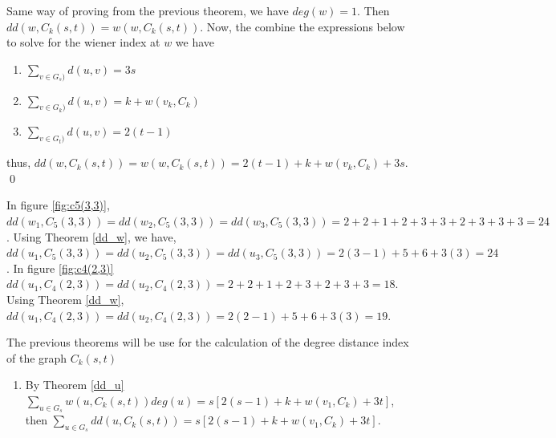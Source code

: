 \begin{e.g.}

\proof
Same way of proving from the previous theorem, we have $deg(w)=1$. Then $dd(w,C_k(s,t))=w(w,C_k(s,t))$. Now, the combine the expressions below to solve for the wiener index at $w$ we have

\begin{enumerate}
\item $\sum_{v\in G_s)}d(u,v)=3s$
\item $\sum_{v\in G_k)}d(u,v)=k+w(v_k,C_k)$
\item $\sum_{v\in G_t)}d(u,v)=2(t-1)$
\end{enumerate}

thus, $dd(w,C_k(s,t))=w(w,C_k(s,t))=2(t-1)+k+w(v_k,C_k)+3s$. \qed

\begin{e.g.}\rm
In figure \ref{fig:c5(3,3)}, $dd(w_1,C_5(3,3))=dd(w_2,C_5(3,3))=dd(w_3,C_5(3,3))=2+2+1+2+3+3+2+3+3+3=24$. Using Theorem \ref{dd_w}, we have, $dd(u_1,C_5(3,3))=dd(u_2,C_5(3,3))=dd(u_3,C_5(3,3))=2(3-1)+5+6+3(3)=24$. In figure \ref{fig:c4(2,3)} $dd(u_1,C_4(2,3))=dd(u_2,C_4(2,3))=2+2+1+2+3+2+3+3=18$. Using Theorem \ref{dd_w}, $dd(u_1,C_4(2,3))=dd(u_2,C_4(2,3))=2(2-1)+5+6+3(3)=19$.
\end{e.g.}


\proof 
The previous theorems will be use for the calculation of the degree distance index of the graph $C_k(s,t)$
\begin{enumerate}
\item {By Theorem \ref{dd_u} $\sum_{u\in G_s}w(u,C_k(s,t))deg(u)=s[2(s-1)+k+w(v_1,C_k)+3t]$, then $\sum_{u\in G_s}dd(u,C_k(s,t))=s[2(s-1)+k+w(v_1,C_k)+3t]$.} 


\end{enumerate}
\end{e.g.}
